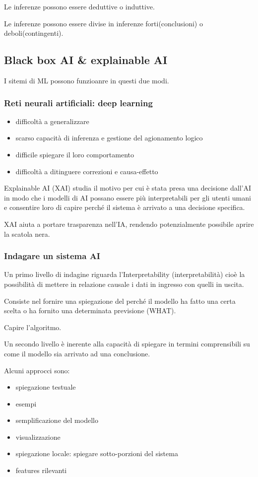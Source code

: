 Le inferenze possono essere deduttive o induttive.

Le inferenze possono essere divise in inferenze forti(conclusioni) o deboli(contingenti).

\subsection{Black box AI & explainable AI}
I sitemi di ML possono funzioanre in questi due modi.


\subsubsection{Reti neurali artificiali: deep learning}
\begin{itemize}
    \item difficoltà a generalizzare
    \item scarso capacità di inferenza e gestione del agionamento logico
    \item difficile spiegare il loro comportamento
    \item difficoltà a ditinguere correzioni e causa-effetto
\end{itemize}

Explainable AI (XAI) studia il motivo per cui è stata presa una decisione
dall’AI in modo che i modelli di AI possano essere più interpretabili per gli
utenti umani e consentire loro di capire perché il sistema è arrivato a una
decisione specifica.

XAI aiuta a portare trasparenza nell'IA, rendendo potenzialmente possibile
aprire la scatola nera.

\subsubsection{Indagare un sistema AI}

Un primo livello di indagine riguarda l’Interpretability (interpretabilità)
cioè la possibilità di mettere in relazione causale i dati in ingresso con
quelli in uscita.

Consiste nel fornire una spiegazione del perché il modello ha fatto una
certa scelta o ha fornito una determinata previsione (WHAT).

Capire l'algoritmo.

Un secondo livello è inerente alla capacità di spiegare in termini comprensibili su come il modello sia
arrivato ad una conclusione.


Alcuni approcci sono:
\begin{itemize}
    \item spiegazione testuale
    \item esempi
    \item semplificazione del modello
    \item visualizzazione
    \item spiegazione locale: spiegare sotto-porzioni del sistema
    \item features rilevanti
\end{itemize}





















